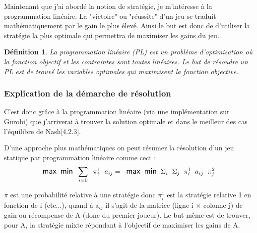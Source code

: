 \documentclass[a4paper, 12pt, twoside]{article}
\newtheorem{definition}{Définition}
\begin{document}
{{Maintenant que j'ai abordé la notion de stratégie, je m'intéresse à la programmation linéaire. La "victoire" ou "réussite" d'un jeu se traduit mathématiquement par le \textsf{gain} le plus élevé. Ainsi le but est donc de d'utiliser la stratégie la plus optimale qui permettra de maximiser les \textsf{gains} du jeu.

\begin{definition}
La programmation linéaire (PL) est un problème d'optimisation où la fonction objectif et les contraintes sont toutes linéaires. Le but de résoudre un PL est de trouvé les variables optimales qui maximisent la fonction objective.
\end{definition}
\subsubsection{Explication de la démarche de résolution}
C'est donc grâce à la \textsf{programmation linéaire} (via une implémentation sur \textsf{Gurobi}) que  j'arriverai à trouver la solution optimale et dans le meilleur des cas \textsf{l'équilibre de Nash}[4.2.3]. \newline

D'une approche plus mathématiques on peut résumer la résolution d'un \textsf{jeu statique} par \textsf{programmation linéaire} comme ceci : \newline
\begin{align*}
\large \textsf{max} \hspace{0,2 cm} \textsf{min} \hspace{0,2 cm} \sum_{i=0}\hspace{0,2 cm} \pi_{i}^{1}\hspace{0,2 cm} a _{ij}  =\hspace{0,2 cm} \textsf{max} \hspace{0,2 cm} \textsf{min} \hspace{0,2 cm}\Sigma _{i}\hspace{0,2 cm} \Sigma _{j}\hspace{0,2 cm} \pi_{i}^{1}\hspace{0,2 cm} a _{ij} \hspace{0,2 cm} \pi_{j}^{2} 
\end{align*}

$ \pi $ est une probabilité relative à une stratégie donc $\pi_{i}^{1}$ est la stratégie relative 1 en fonction de i (etc...), quand à a$ _{ij} $ il s'agit de la matrice (ligne \textsf{i} $\times$ colonne \textsf{j}) de gain ou récompense de A (donc du premier joueur).  Le but même est de trouver, pour A, la stratégie mixte répondant à l'objectif de maximiser les gains de A. \newline

}}
\end{document}
